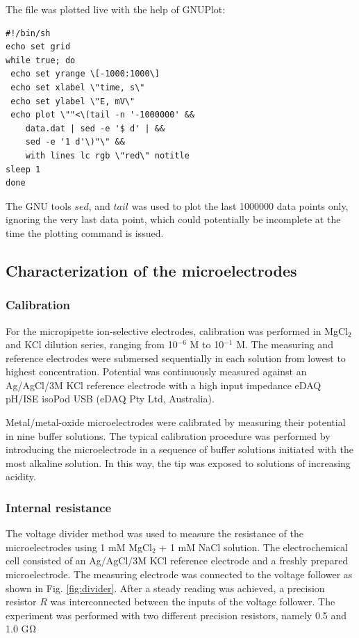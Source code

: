 The file was plotted live with the help of GNUPlot:

\begin{lstlisting}
#!/bin/sh
echo set grid
while true; do
 echo set yrange \[-1000:1000\]
 echo set xlabel \"time, s\"
 echo set ylabel \"E, mV\"
 echo plot \""<\(tail -n '-1000000' &&
	data.dat | sed -e '$ d' | &&
	sed -e '1 d'\)"\" &&
	with lines lc rgb \"red\" notitle
sleep 1
done
\end{lstlisting}

The GNU tools $sed$, and $tail$ was used to plot the last 1000000 data points only, ignoring the very last data point, which could potentially be incomplete at the time the plotting command is issued.

 		\subsection{Characterization of the microelectrodes}
			\subsubsection{Calibration}
For the micropipette ion-selective electrodes, calibration was performed in MgCl$_2$ and KCl dilution series, ranging from 10$^{-6}$ M to 10$^{-1}$ M.
The measuring and reference electrodes were submersed sequentially in each solution from lowest to highest concentration.
Potential was continuously measured against an Ag/AgCl/3M KCl reference electrode with a high input impedance eDAQ pH/ISE isoPod USB (eDAQ Pty Ltd, Australia).

Metal/metal-oxide microelectrodes were calibrated by measuring their potential in nine buffer solutions.
The typical calibration procedure was performed by introducing the microelectrode in a sequence of buffer solutions initiated with the most alkaline solution.
In this way, the tip was exposed to solutions of increasing acidity.
 
			\subsubsection{Internal resistance}
The voltage divider method was used to measure the resistance of the microelectrodes using 1 mM MgCl$_2$ + 1 mM NaCl solution.
The electrochemical cell consisted of an Ag/AgCl/3M KCl reference electrode and a freshly prepared microelectrode.
The measuring electrode was connected to the voltage follower as shown in Fig. \ref{fig:divider}.
After a steady reading was achieved, a precision resistor $R$ was interconnected between the inputs of the voltage follower.
The experiment was performed with two different precision resistors, namely 0.5 and 1.0 G$\ohm$


